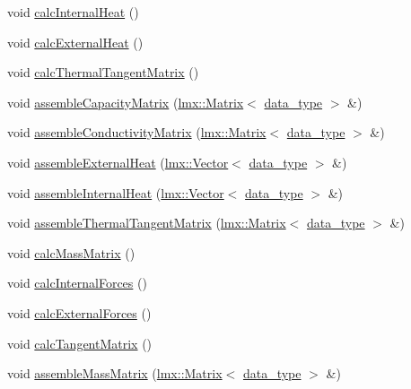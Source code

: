 \begin{DoxyCompactItemize}
\item 
void \hyperlink{classmknix_1_1_system_aae558245091381f7d833292fbf64f6e0}{calc\+Internal\+Heat} ()
\item 
void \hyperlink{classmknix_1_1_system_a8c01b52d2f2fb7de0ac6e1c64bda81a3}{calc\+External\+Heat} ()
\item 
void \hyperlink{classmknix_1_1_system_acbdbe27b8bd40d8f04b7bea37ccbc501}{calc\+Thermal\+Tangent\+Matrix} ()
\item 
void \hyperlink{classmknix_1_1_system_a354c0df800fe9729c73f7260d76273df}{assemble\+Capacity\+Matrix} (\hyperlink{classlmx_1_1_matrix}{lmx\+::\+Matrix}$<$ \hyperlink{namespacemknix_a16be4b246fbf2cceb141e3a179111020}{data\+\_\+type} $>$ \&)
\item 
void \hyperlink{classmknix_1_1_system_a6345dce07d1da92c969608340be7a604}{assemble\+Conductivity\+Matrix} (\hyperlink{classlmx_1_1_matrix}{lmx\+::\+Matrix}$<$ \hyperlink{namespacemknix_a16be4b246fbf2cceb141e3a179111020}{data\+\_\+type} $>$ \&)
\item 
void \hyperlink{classmknix_1_1_system_aa32a7ce62666f3a93c4448d2f70ccac8}{assemble\+External\+Heat} (\hyperlink{classlmx_1_1_vector}{lmx\+::\+Vector}$<$ \hyperlink{namespacemknix_a16be4b246fbf2cceb141e3a179111020}{data\+\_\+type} $>$ \&)
\item 
void \hyperlink{classmknix_1_1_system_a8c30a5ba93065ccdc3759eb2a3df4a22}{assemble\+Internal\+Heat} (\hyperlink{classlmx_1_1_vector}{lmx\+::\+Vector}$<$ \hyperlink{namespacemknix_a16be4b246fbf2cceb141e3a179111020}{data\+\_\+type} $>$ \&)
\item 
void \hyperlink{classmknix_1_1_system_aca820f8a0e3ec73e4bea94551fe31875}{assemble\+Thermal\+Tangent\+Matrix} (\hyperlink{classlmx_1_1_matrix}{lmx\+::\+Matrix}$<$ \hyperlink{namespacemknix_a16be4b246fbf2cceb141e3a179111020}{data\+\_\+type} $>$ \&)
\item 
void \hyperlink{classmknix_1_1_system_a3da01e379f5c907be67439ae2b0770c8}{calc\+Mass\+Matrix} ()
\item 
void \hyperlink{classmknix_1_1_system_acbc22a9f660d0f818d461934eb0f1193}{calc\+Internal\+Forces} ()
\item 
void \hyperlink{classmknix_1_1_system_a1f8741218772bc4d2b5a61b1ded98bc4}{calc\+External\+Forces} ()
\item 
void \hyperlink{classmknix_1_1_system_a2dcf37e480b19ef48aab29e484a68f7d}{calc\+Tangent\+Matrix} ()
\item 
void \hyperlink{classmknix_1_1_system_ae7d34bdd8c9c12ba24663f3f2e3ef75c}{assemble\+Mass\+Matrix} (\hyperlink{classlmx_1_1_matrix}{lmx\+::\+Matrix}$<$ \hyperlink{namespacemknix_a16be4b246fbf2cceb141e3a179111020}{data\+\_\+type} $>$ \&)

\end{DoxyCompactItemize}

